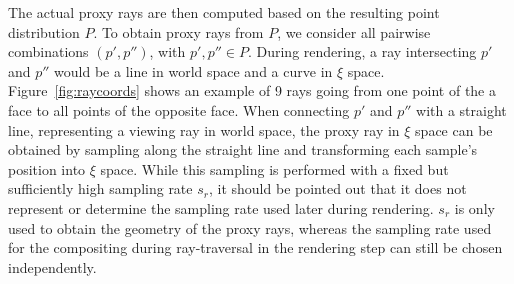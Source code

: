 \documentclass[journal]{vgtc}                %
\begin{document}
The actual proxy rays are then computed based on the resulting point distribution $P$. To obtain proxy rays from $P$, we consider all pairwise combinations $(p',p'')$, with $p',p'' \in P$. During rendering, a ray intersecting $p'$ and $p''$ would be a line in world space and a curve in $\xi$ space. Figure~\ref{fig:raycoords} shows an example of 9 rays going from one point of the a face to all points of the opposite face. When connecting $p'$ and $p''$ with a straight line, representing a viewing ray in world space, the proxy ray in $\xi$ space can be obtained by sampling along the straight line and transforming each sample's position into $\xi$ space. While this sampling is performed with a fixed but sufficiently high sampling rate $s_r$, it should be pointed out that it does not represent or determine the sampling rate used later during rendering. $s_r$ is only used to obtain the geometry of the proxy rays, whereas the sampling rate used for the compositing during ray-traversal in the rendering step can still be chosen independently.


\end{document}
